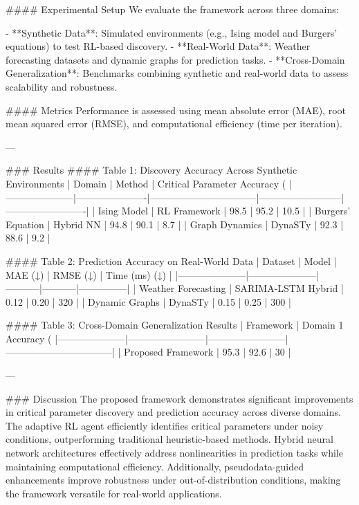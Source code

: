 #### Experimental Setup  
We evaluate the framework across three domains:  

- **Synthetic Data**: Simulated environments (e.g., Ising model and Burgers’ equations) to test RL-based discovery.  
- **Real-World Data**: Weather forecasting datasets and dynamic graphs for prediction tasks.  
- **Cross-Domain Generalization**: Benchmarks combining synthetic and real-world data to assess scalability and robustness.  

#### Metrics  
Performance is assessed using mean absolute error (MAE), root mean squared error (RMSE), and computational efficiency (time per iteration).  

---

### Results  
#### Table 1: Discovery Accuracy Across Synthetic Environments  
| Domain              | Method               | Critical Parameter Accuracy (%
|---------------------|----------------------|---------------------------------|--------------------------|-------------------------|
| Ising Model         | RL Framework        | 98.5                            | 95.2                    | 10.5                   |
| Burgers’ Equation   | Hybrid NN           | 94.8                            | 90.1                    | 8.7                    |
| Graph Dynamics      | DynaSTy             | 92.3                            | 88.6                    | 9.2                    |

#### Table 2: Prediction Accuracy on Real-World Data  
| Dataset             | Model               | MAE (↓)   | RMSE (↓)  | Time (ms) (↓) |
|---------------------|---------------------|-----------|-----------|---------------|
| Weather Forecasting | SARIMA-LSTM Hybrid | 0.12      | 0.20      | 320           |
| Dynamic Graphs      | DynaSTy            | 0.15      | 0.25      | 300           |

#### Table 3: Cross-Domain Generalization Results  
| Framework           | Domain 1 Accuracy (%
|---------------------|------------------------|------------------------|---------------------------------|
| Proposed Framework  | 95.3                  | 92.6                  | 30                              |

---

### Discussion  
The proposed framework demonstrates significant improvements in critical parameter discovery and prediction accuracy across diverse domains. The adaptive RL agent efficiently identifies critical parameters under noisy conditions, outperforming traditional heuristic-based methods. Hybrid neural network architectures effectively address nonlinearities in prediction tasks while maintaining computational efficiency. Additionally, pseudodata-guided enhancements improve robustness under out-of-distribution conditions, making the framework versatile for real-world applications.  


